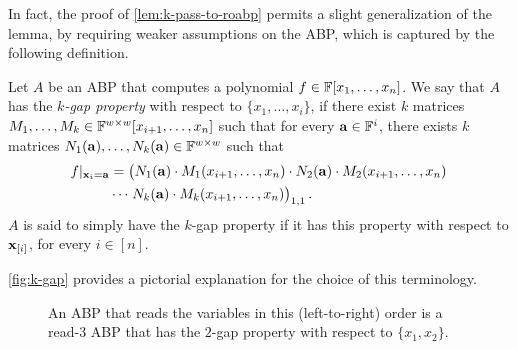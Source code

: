 \documentclass[11pt]{article}
\newcommand{\exi}{\vecx_{[i]}}
\begin{document}
In fact, the proof of \autoref{lem:k-pass-to-roabp} permits a slight generalization of the lemma, by requiring weaker assumptions on the ABP, which is captured by the following definition.

\begin{definition}
\label{def:k-gap}
Let $A$ be an ABP that computes a polynomial $f \in \F[x_1, \ldots, x_n]$. We say that $A$ has the {\em $k$-gap property} with respect to $\{x_1, \ldots, x_i\}$, if there exist $k$ matrices $M_1, \ldots, M_k \in \F^{w \times w}[x_{i+1}, \ldots, x_n]$ such that for every $\veca \in \F^{i}$, there exists $k$ matrices $N_1(\veca), \ldots, N_{k}(\veca) \in \F^{w \times w}$ such that 
\begin{align}
\label{eq:k-gap}
f|_{\vecx_i = \veca} &= \left( \vphantom{M^{1,1}} N_1(\veca) \cdot M_1(x_{i+1},\ldots,x_n) \cdot N_2(\veca) \cdot M_2(x_{i+1},\ldots, x_n)\right. \nonumber\\
&\cdots \left. \vphantom{M^{1,1}}  N_k(\veca) \cdot  M_{k}(x_{i+1},\ldots,x_n) \right)_{1,1}.
\end{align}
$A$ is said to simply have the $k$-gap property if it has this property with respect to $\exi$, for every $i \in [n]$.
\end{definition}

\autoref{fig:k-gap} provides a pictorial explanation for the choice of this terminology.

\begin{figure}[h]
\begin{center}
\caption{An ABP that reads the variables in this (left-to-right) order is a read-$3$ ABP that has the $2$-gap property with respect to $\{x_1,x_2\}$.}
\label{fig:k-gap}
\end{center}
\end{figure}
\end{document}
